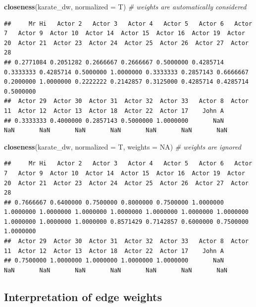 \documentclass[
]{book}
\newenvironment{Shaded}{\begin{snugshade}}{\end{snugshade}}
\newcommand{\AttributeTok}[1]{\textcolor[rgb]{0.13,0.29,0.53}{#1}}
\newcommand{\CommentTok}[1]{\textcolor[rgb]{0.56,0.35,0.01}{\textit{#1}}}
\newcommand{\ConstantTok}[1]{\textcolor[rgb]{0.56,0.35,0.01}{#1}}
\newcommand{\FunctionTok}[1]{\textcolor[rgb]{0.13,0.29,0.53}{\textbf{#1}}}
\newcommand{\NormalTok}[1]{#1}
\begin{document}
\begin{Shaded}
\begin{Highlighting}[]
\FunctionTok{closeness}\NormalTok{(karate\_dw, }\AttributeTok{normalized =}\NormalTok{ T) }\CommentTok{\# weights are automatically considered}
\end{Highlighting}
\end{Shaded}

\begin{verbatim}
##     Mr Hi   Actor 2   Actor 3   Actor 4   Actor 5   Actor 6   Actor 7   Actor 9  Actor 10  Actor 14  Actor 15  Actor 16  Actor 19  Actor 20  Actor 21  Actor 23  Actor 24  Actor 25  Actor 26  Actor 27  Actor 28 
## 0.2771084 0.2051282 0.2666667 0.2666667 0.5000000 0.4285714 0.3333333 0.4285714 0.5000000 1.0000000 0.3333333 0.2857143 0.6666667 0.2000000 1.0000000 0.2222222 0.2142857 0.3125000 0.4285714 0.4285714 0.5000000 
##  Actor 29  Actor 30  Actor 31  Actor 32  Actor 33   Actor 8  Actor 11  Actor 12  Actor 13  Actor 18  Actor 22  Actor 17    John A 
## 0.3333333 0.4000000 0.2857143 0.5000000 1.0000000       NaN       NaN       NaN       NaN       NaN       NaN       NaN       NaN
\end{verbatim}

\begin{Shaded}
\begin{Highlighting}[]
\FunctionTok{closeness}\NormalTok{(karate\_dw, }\AttributeTok{normalized =}\NormalTok{ T, }\AttributeTok{weights =} \ConstantTok{NA}\NormalTok{) }\CommentTok{\# weights are ignored}
\end{Highlighting}
\end{Shaded}

\begin{verbatim}
##     Mr Hi   Actor 2   Actor 3   Actor 4   Actor 5   Actor 6   Actor 7   Actor 9  Actor 10  Actor 14  Actor 15  Actor 16  Actor 19  Actor 20  Actor 21  Actor 23  Actor 24  Actor 25  Actor 26  Actor 27  Actor 28 
## 0.7666667 0.6400000 0.7500000 0.8000000 0.7500000 1.0000000 1.0000000 1.0000000 1.0000000 1.0000000 1.0000000 1.0000000 1.0000000 1.0000000 1.0000000 1.0000000 0.8571429 0.7142857 0.6000000 0.7500000 1.0000000 
##  Actor 29  Actor 30  Actor 31  Actor 32  Actor 33   Actor 8  Actor 11  Actor 12  Actor 13  Actor 18  Actor 22  Actor 17    John A 
## 0.7500000 1.0000000 1.0000000 1.0000000 1.0000000       NaN       NaN       NaN       NaN       NaN       NaN       NaN       NaN
\end{verbatim}

\subsection{Interpretation of edge weights}\label{interpretation-of-edge-weights}
\end{document}
